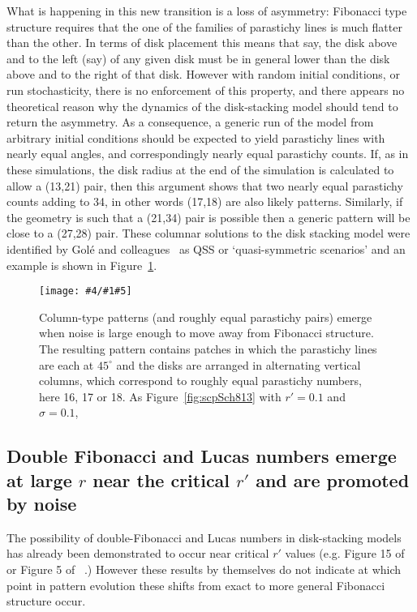 \documentclass[a4paper,10pt]{amsart}
\newlength{\jfigwidth}
\newcommand{\pdffig}[3]{\jdofig{#1}{#2}{#3}{Figures}{.pdf}}
\newcommand{\jdofig}[5]{
	\begin{figure}\centering\texttt{[image: \#4/\#1\#5]} \caption{#2}\label{fig:#1}\end{figure}
}
\begin{document}
What is happening in this new transition is a loss of asymmetry:  Fibonacci type structure requires that the one of the families of parastichy lines is much flatter than the other. In terms of disk placement this means that say, the disk above and to the left (say) of any given disk must be in general lower than the disk above and to the right of that disk. However with random initial conditions, or run stochasticity, there is no enforcement of this property, and there appears no theoretical reason why the dynamics of the disk-stacking model should tend to return the asymmetry. As a consequence, a generic run of the model from arbitrary initial conditions should be expected to yield parastichy lines with nearly equal angles, and correspondingly nearly equal parastichy counts. If, as in these simulations, the disk radius at the end of the simulation is calculated to allow a (13,21) pair, then this argument shows that two nearly equal parastichy counts adding to 34, in other words (17,18) are also likely patterns. Similarly, if the geometry is such that a (21,34) pair is possible then a generic pattern will be close to a (27,28) pair. These columnar solutions to the disk stacking model were identified by Gol\'e and colleagues~\cite{goleFibonacciQuasisymmetricPhyllotaxis2016} as QSS or `quasi-symmetric scenarios'  and an example is shown in Figure~\ref{fig:scpColumn}.
\pdffig{scpColumn}{Column-type patterns (and roughly equal parastichy pairs) emerge when noise is large enough to move away from Fibonacci structure. The resulting pattern contains patches in which the parastichy lines are each at $45^\circ$ and the disks are arranged in alternating vertical columns, which correspond to roughly equal parastichy numbers, here 16, 17 or 18. As Figure~\ref{fig:scpSch813} with $r'=0.1$ and $\sigma=0.1$, }{1}
\clearpage
\subsection{Double Fibonacci and Lucas numbers emerge at large $r$ near the critical $r'$ and are promoted by noise}
The possibility of double-Fibonacci and Lucas numbers in disk-stacking models has already been demonstrated to occur near critical $r'$ values (e.g. Figure 15 of~\cite{goleFibonacciQuasisymmetricPhyllotaxis2016} or Figure 5 of ~\cite{yonekuraMathematicalModelStudies2019}.) However these results by themselves do not indicate at which point in pattern evolution these shifts from exact to more general Fibonacci structure occur. 
\end{document}
